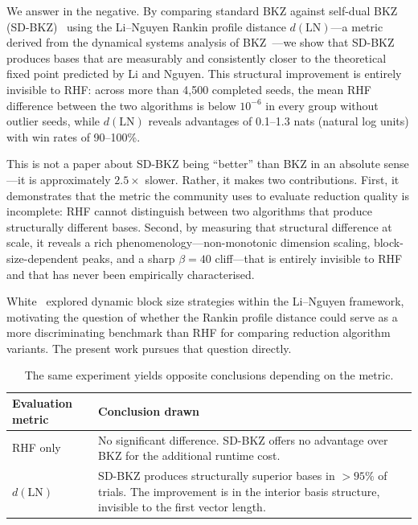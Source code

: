 \documentclass[journal=cic,version=preprint]{iacrj}
\begin{document}
We answer in the negative. By comparing standard BKZ against self-dual BKZ (SD-BKZ)~\cite{EC:MicWal16} using the Li--Nguyen Rankin profile distance $d(\mathrm{LN})$---a metric derived from the dynamical systems analysis of BKZ~\cite{EPRINT:LiNgu20}---we show that SD-BKZ produces bases that are measurably and consistently closer to the theoretical fixed point predicted by Li and Nguyen. This structural improvement is entirely invisible to RHF: across more than 4{,}500 completed seeds, the mean RHF difference between the two algorithms is below $10^{-6}$ in every group without outlier seeds, while $d(\mathrm{LN})$ reveals advantages of 0.1--1.3 nats (natural log units) with win rates of 90--100\%.

This is not a paper about SD-BKZ being ``better'' than BKZ in an absolute sense---it is approximately $2.5\times$ slower. Rather, it makes two contributions. First, it demonstrates that the metric the community uses to evaluate reduction quality is incomplete: RHF cannot distinguish between two algorithms that produce structurally different bases. Second, by measuring that structural difference at scale, it reveals a rich phenomenology---non-monotonic dimension scaling, block-size-dependent peaks, and a sharp $\beta=40$ cliff---that is entirely invisible to RHF and that has never been empirically characterised.

White~\cite{White26} explored dynamic block size strategies within the Li--Nguyen framework, motivating the question of whether the Rankin profile distance could serve as a more discriminating benchmark than RHF for comparing reduction algorithm variants. The present work pursues that question directly.

\begin{table}[tbp]
\centering
\caption{The same experiment yields opposite conclusions depending on the metric.\label{tab:metric-split}}
\begin{tabular}{p{3.2cm}p{8.5cm}}
\hline
\textbf{Evaluation metric} & \textbf{Conclusion drawn} \\
\hline
RHF only & No significant difference. SD-BKZ offers no advantage over BKZ for the additional runtime cost. \\
$d(\mathrm{LN})$ & SD-BKZ produces structurally superior bases in $>95\%$ of trials. The improvement is in the interior basis structure, invisible to the first vector length. \\
\hline
\end{tabular}
\end{table}
\end{document}
